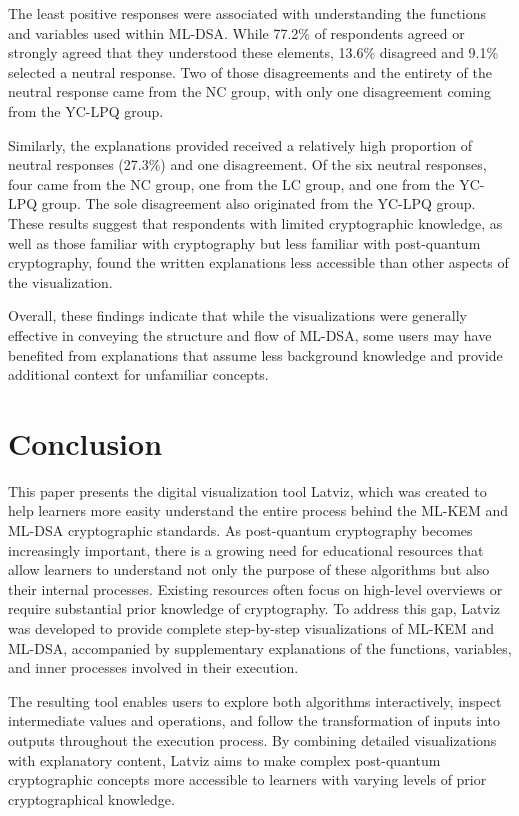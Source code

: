 \documentclass[runningheads]{llncs}
\begin{document}
The least positive responses were associated with understanding the functions and variables used within ML-DSA. While 77.2\% of respondents agreed or strongly agreed that they understood these elements, 13.6\% disagreed and 9.1\% selected a neutral response. Two of those disagreements and the entirety of the neutral response came from the NC group, with only one disagreement coming from the YC-LPQ group. 

Similarly, the explanations provided received a relatively high proportion of neutral responses (27.3\%) and one disagreement. Of the six neutral responses, four came from the NC group, one from the LC group, and one from the YC-LPQ group. The sole disagreement also originated from the YC-LPQ group. These results suggest that respondents with limited cryptographic knowledge, as well as those familiar with cryptography but less familiar with post-quantum cryptography, found the written explanations less accessible than other aspects of the visualization.

Overall, these findings indicate that while the visualizations were generally effective in conveying the structure and flow of ML-DSA, some users may have benefited from explanations that assume less background knowledge and provide additional context for unfamiliar concepts.

\section{Conclusion}
This paper presents the digital visualization tool Latviz, which was created to help learners more easity understand the entire process behind the ML-KEM and ML-DSA cryptographic standards. As post-quantum cryptography becomes increasingly important, there is a growing need for educational resources that allow learners to understand not only the purpose of these algorithms but also their internal processes. Existing resources often focus on high-level overviews or require substantial prior knowledge of cryptography. To address this gap, Latviz was developed to provide complete step-by-step visualizations of ML-KEM and ML-DSA, accompanied by supplementary explanations of the functions, variables, and inner processes involved in their execution.

The resulting tool enables users to explore both algorithms interactively, inspect intermediate values and operations, and follow the transformation of inputs into outputs throughout the execution process. By combining detailed visualizations with explanatory content, Latviz aims to make complex post-quantum cryptographic concepts more accessible to learners with varying levels of prior cryptographical knowledge.
\end{document}
